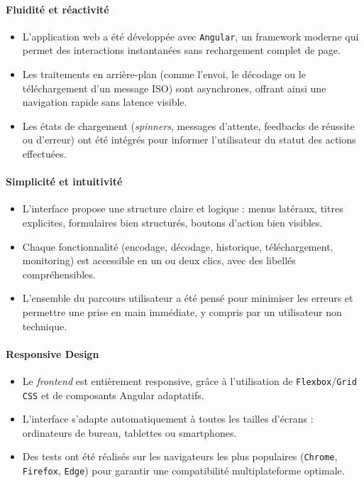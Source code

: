 \begin{enumerate}[label=\textbf{\alph*.}]
\paragraph{Fluidité et réactivité}
\begin{itemize}[label=\textbullet]
    \item L’application web a été développée avec \texttt{Angular}, un framework moderne qui permet des interactions instantanées sans rechargement complet de page.
    \item Les traitements en arrière-plan (comme l'envoi, le décodage ou le téléchargement d’un message ISO) sont asynchrones, offrant ainsi une navigation rapide sans latence visible.
    \item Les états de chargement (\textit{spinners}, messages d’attente, feedbacks de réussite ou d’erreur) ont été intégrés pour informer l'utilisateur du statut des actions effectuées.
\end{itemize}


\paragraph{Simplicité et intuitivité}
\begin{itemize}[label=\textbullet]
    \item L’interface propose une structure claire et logique : menus latéraux, titres explicites, formulaires bien structurés, boutons d’action bien visibles.
    \item Chaque fonctionnalité (encodage, décodage, historique, téléchargement, monitoring) est accessible en un ou deux clics, avec des libellés compréhensibles.
    \item L’ensemble du parcours utilisateur a été pensé pour minimiser les erreurs et permettre une prise en main immédiate, y compris par un utilisateur non technique.
\end{itemize}

\paragraph{Responsive Design}
\begin{itemize}[label=\textbullet]
    \item Le \textit{frontend} est entièrement responsive, grâce à l’utilisation de \texttt{Flexbox}/\texttt{Grid CSS} et de composants Angular adaptatifs.
    \item L’interface s’adapte automatiquement à toutes les tailles d’écrans : ordinateurs de bureau, tablettes ou smartphones.
    \item Des tests ont été réalisés sur les navigateurs les plus populaires (\texttt{Chrome}, \texttt{Firefox}, \texttt{Edge}) pour garantir une compatibilité multiplateforme optimale.
\end{itemize}


\end{enumerate}
